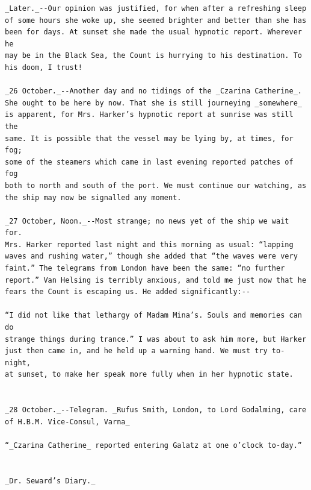 \documentclass{article}
\begin{document}
\begin{verbatim}
_Later._--Our opinion was justified, for when after a refreshing sleep
of some hours she woke up, she seemed brighter and better than she has
been for days. At sunset she made the usual hypnotic report. Wherever he
may be in the Black Sea, the Count is hurrying to his destination. To
his doom, I trust!

_26 October._--Another day and no tidings of the _Czarina Catherine_.
She ought to be here by now. That she is still journeying _somewhere_
is apparent, for Mrs. Harker’s hypnotic report at sunrise was still the
same. It is possible that the vessel may be lying by, at times, for fog;
some of the steamers which came in last evening reported patches of fog
both to north and south of the port. We must continue our watching, as
the ship may now be signalled any moment.

_27 October, Noon._--Most strange; no news yet of the ship we wait for.
Mrs. Harker reported last night and this morning as usual: “lapping
waves and rushing water,” though she added that “the waves were very
faint.” The telegrams from London have been the same: “no further
report.” Van Helsing is terribly anxious, and told me just now that he
fears the Count is escaping us. He added significantly:--

“I did not like that lethargy of Madam Mina’s. Souls and memories can do
strange things during trance.” I was about to ask him more, but Harker
just then came in, and he held up a warning hand. We must try to-night,
at sunset, to make her speak more fully when in her hypnotic state.


_28 October._--Telegram. _Rufus Smith, London, to Lord Godalming, care
of H.B.M. Vice-Consul, Varna_

“_Czarina Catherine_ reported entering Galatz at one o’clock to-day.”


_Dr. Seward’s Diary._


\end{verbatim}
\end{document}
